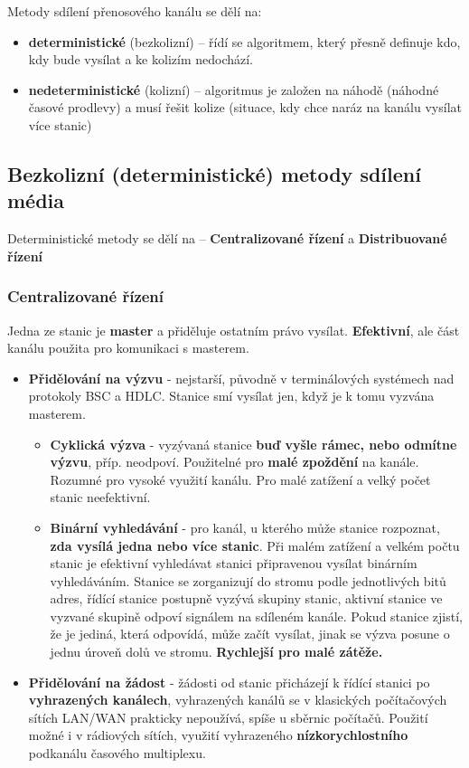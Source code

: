 Metody sdílení přenosového kanálu se dělí na:
\begin{itemize}
	\item \textbf{deterministické} (bezkolizní) -- řídí se algoritmem, který přesně definuje kdo, kdy bude vysílat a ke kolizím nedochází.
	\item \textbf{nedeterministické} (kolizní) -- algoritmus je založen na náhodě (náhodné časové prodlevy) a musí řešit kolize (situace, kdy chce naráz na kanálu vysílat více stanic)
\end{itemize}

\subsection{Bezkolizní (deterministické) metody sdílení média}
Deterministické metody se dělí na -- \textbf{Centralizované řízení} a \textbf{Distribuované řízení}

\subsubsection{Centralizované řízení}
Jedna ze stanic je \textbf{master} a přiděluje ostatním právo vysílat. \textbf{Efektivní}, ale část kanálu použita pro komunikaci s masterem.
\begin{itemize}
	\item \textbf{Přidělování na výzvu} - nejstarší, původně v terminálových systémech nad protokoly BSC a HDLC. Stanice smí vysílat jen, když je k tomu vyzvána masterem.
	\begin{itemize}
	\item \textbf{Cyklická výzva} - vyzývaná stanice \textbf{buď vyšle rámec, nebo odmítne výzvu}, příp. neodpoví. Použitelné pro \textbf{malé zpoždění} na kanále. Rozumné pro vysoké využití kanálu. Pro malé zatížení a velký počet stanic neefektivní.
	\item \textbf{Binární vyhledávání} - pro kanál, u kterého může stanice rozpoznat,\textbf{ zda vysílá jedna nebo více stanic}. Při malém zatížení a velkém počtu stanic je efektivní vyhledávat stanici připravenou vysílat binárním vyhledáváním. Stanice se zorganizují do stromu podle jednotlivých bitů adres, řídící stanice postupně vyzývá skupiny stanic, aktivní stanice ve vyzvané skupině odpoví signálem na sdíleném kanále. Pokud stanice zjistí, že je jediná, která odpovídá, může začít vysílat, jinak se výzva posune o jednu úroveň dolů ve stromu. \textbf{Rychlejší pro malé zátěže.}
\end{itemize}
	\item \textbf{Přidělování na žádost} - žádosti od stanic přicházejí k řídící stanici po \textbf{vyhrazených kanálech}, vyhrazených kanálů se v klasických počítačových sítích LAN/WAN prakticky nepoužívá, spíše u sběrnic počítačů. Použití možné i v rádiových sítích, využití vyhrazeného \textbf{nízkorychlostního} podkanálu časového multiplexu.
\end{itemize}

